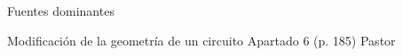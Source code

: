 \documentclass[aspectratio=169, usenames,svgnames,dvipsnames]{beamer}
\begin{document}
\begin{frame}[label={sec:orgb21fa58}]{Fuentes dominantes}
\end{frame}

\begin{frame}[label={sec:orgbfba0f9}]{Modificación de la geometría de un circuito}
Apartado 6 (p. 185) Pastor
\end{frame}
\end{document}
